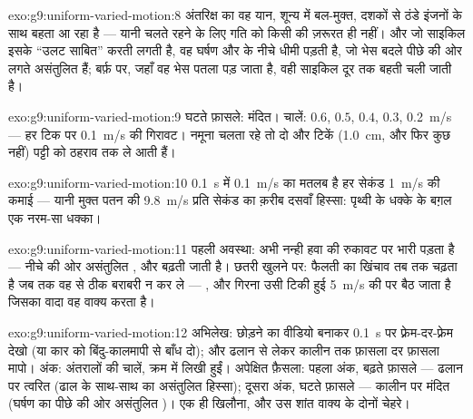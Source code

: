 \begin{solution}{exo:g9:uniform-varied-motion:8}
अंतरिक्ष का वह यान, शून्य में बल-मुक्त, दशकों से ठंडे इंजनों के साथ बहता
आ रहा है --- यानी चलते रहने के लिए गति को किसी  की ज़रूरत ही नहीं।
और जो साइकिल इसके ``उलट साबित'' करती लगती है, वह घर्षण और  के नीचे
धीमी पड़ती है, जो भेस बदले पीछे की ओर लगते असंतुलित  हैं; बर्फ़ पर,
जहाँ वह भेस पतला पड़ जाता है, वही साइकिल दूर तक बहती चली जाती है।
\end{solution}

\begin{solution}{exo:g9:uniform-varied-motion:9}
घटते फ़ासले: मंदित। चालें: $0.6$, $0.5$, $0.4$, $0.3$,
\qty{0.2}{m/s} --- हर टिक पर \qty{0.1}{m/s} की गिरावट। नमूना चलता
रहे तो दो और टिकें (\qty{1.0}{cm}, और फिर कुछ नहीं) पट्टी को ठहराव तक
ले आती हैं।
\end{solution}

\begin{solution}{exo:g9:uniform-varied-motion:10}
\qty{0.1}{s} में \qty{0.1}{m/s} का मतलब है हर सेकंड \qty{1}{m/s} की
कमाई --- यानी मुक्त पतन की \qty{9.8}{m/s} प्रति सेकंड का क़रीब दसवाँ
हिस्सा: पृथ्वी के धक्के के बग़ल एक नरम-सा धक्का।
\end{solution}

\begin{solution}{exo:g9:uniform-varied-motion:11}
पहली अवस्था:  अभी नन्ही हवा की रुकावट पर भारी पड़ता है --- नीचे की
ओर असंतुलित , और  बढ़ती जाती है। छतरी खुलने पर: फैलती  का
खिंचाव तब तक चढ़ता है जब तक वह  से ठीक बराबरी न कर ले ---
 , और गिरना उसी टिकी हुई \qty{5}{m/s} की  पर बैठ जाता है
जिसका वादा वह वाक्य करता है।
\end{solution}

\begin{solution}{exo:g9:uniform-varied-motion:12}
अभिलेख: छोड़ने का वीडियो बनाकर \qty{0.1}{s} पर फ़्रेम-दर-फ़्रेम देखो
(या कार को बिंदु-कालमापी से बाँध दो); और ढलान से लेकर कालीन तक फ़ासला
दर फ़ासला मापो। अंक: अंतरालों की चालें, क्रम में लिखी हुईं। अपेक्षित
फ़ैसला: पहला अंक, बढ़ते फ़ासले --- ढलान पर त्वरित (ढाल के साथ-साथ 
का असंतुलित हिस्सा); दूसरा अंक, घटते फ़ासले --- कालीन पर मंदित (घर्षण
का पीछे की ओर असंतुलित )। एक ही खिलौना, और उस शांत वाक्य के दोनों
चेहरे।
\end{solution}


